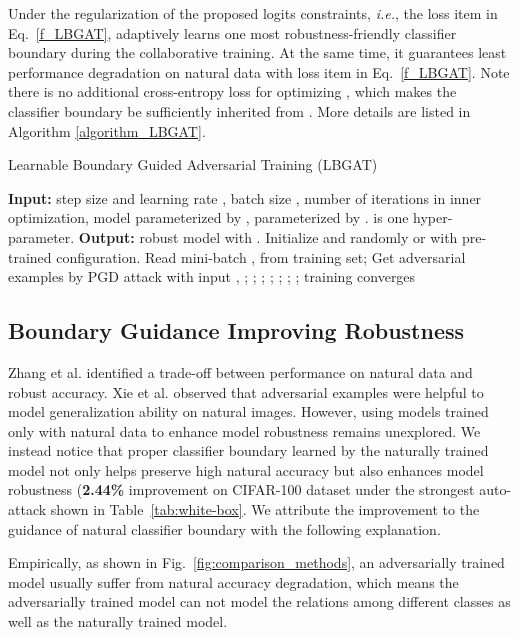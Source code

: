 \documentclass[10pt,twocolumn,letterpaper]{article}
\begin{document}
Under the regularization of the proposed logits constraints, {\it i.e.}, the  loss item in Eq.~\eqref{f_LBGAT},  adaptively learns one most robustness-friendly classifier boundary during the collaborative training. At the same time, it guarantees least performance degradation on natural data with  loss item in Eq.~\eqref{f_LBGAT}. Note there is no additional cross-entropy loss for optimizing , which makes the classifier boundary be sufficiently inherited from . More details are listed in Algorithm \ref{algorithm_LBGAT}.

\begin{algorithm}[t]
	\caption{Learnable Boundary Guided Adversarial Training (LBGAT)}
	\label{algorithm_LBGAT}
	\begin{algorithmic}[1]
		\State \textbf{Input:} step size  and learning rate , batch size , number of iterations  in inner optimization, model  parameterized by ,  parameterized by .  is one hyper-parameter.
		\State \textbf{Output:} robust model  with .
		\State Initialize  and  randomly or with pre-trained configuration.
		\Repeat
		\State Read mini-batch ,  from training set;
		\State Get adversarial examples  by PGD attack with input , ;
		\State ;
		\State ;
		\State ;
		\State ;
		\State ;
		\State ;
		\Until training converges
	\end{algorithmic}
\end{algorithm}

\subsection{Boundary Guidance Improving Robustness} 
Zhang et al. \cite{zhang2019theoretically} identified a trade-off between performance on natural data and robust accuracy. Xie et al. \cite{xie2020adversarial} observed that adversarial examples were helpful to model generalization ability on natural images. However, using models trained only with natural data to enhance model robustness remains unexplored. We instead notice that proper classifier boundary learned by the naturally trained model not only helps preserve high natural accuracy but also enhances model robustness (\textbf{2.44\%} improvement on CIFAR-100 dataset under the strongest auto-attack \cite{croce2020reliable} shown in Table~\ref{tab:white-box}. We attribute the improvement to the guidance of natural classifier boundary with the following explanation. 

Empirically, as shown in Fig.~\ref{fig:comparison_methods}, an adversarially trained model usually suffer from natural accuracy degradation, which means the adversarially trained model can not model the relations among different classes as well as the naturally trained model.
\end{document}
